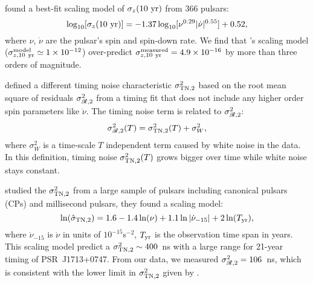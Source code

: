 {\bfref
\citet{hlk10} found a best-fit scaling model of $\sigma_z({\rm 10~yr})$ 
from 366 pulsars:
\begin{equation}
\label{eq:hlk10}
\log_{10}[\sigma_z({\rm 10~yr})] =
-1.37\log_{10}[\nu^{0.29}|\dot{\nu}|^{0.55}]+0.52,
\end{equation} 
where $\nu$, $\dot{\nu}$ are the pulsar's spin and spin-down rate.
We find that \citet{hlk10}'s scaling model ($\sigma^{\rm model}_{z, \rm
10~yr}\simeq1\times10^{-12}$) over-predict $\sigma^{\rm measured}_{z, \rm
10~yr}=4.9\times10^{-16}$ by more than three orders of magnitude. 

\citet{ch80} defined a different timing noise characteristic $\sigma^2_{\rm
TN,2}$ based on the root mean square of residuals $\sigma^2_{\mathscr{R},2}$ from a
timing fit that does not include any higher order spin parameters like
$\ddot{\nu}$. 
The timing noise term is related to $\sigma^2_{\mathscr{R},2}$:
\begin{equation}
\sigma^2_{\mathscr{R},2}(T) = \sigma^2_{\rm TN,2}(T) + \sigma^2_W, 
\end{equation}
where $\sigma^2_W$ is a time-scale $T$ independent term caused by white 
noise in the data.
In this definition, timing noise $\sigma^2_{\rm TN,2}(T)$ grows bigger over
time while white noise stays constant.  

\citet{sc10} studied the $\sigma^2_{\rm TN,2}$ from a large sample of pulsars
including canonical pulsars (CPs) and millisecond pulsars, they found a scaling
model:
\begin{equation}
\label{eq:sc10}
\ln(\hat{\sigma}_{\rm TN,2}) = 1.6 - 1.4\ln(\nu) +
1.1\ln|\dot{\nu}_{-15}|+2\ln(T_{\rm yr}),
\end{equation}
where $\dot{\nu}_{-15}$ is $\dot{\nu}$ in units of $10^{-15}$s$^{-2}$, $T_{\rm yr}$ is the 
observation time span in years.
This scaling model predict a $\sigma^2_{\rm TN,2}\sim400$~ns with a large
range for 21-year timing of PSR~J1713+0747. From our data, we measured
$\sigma^2_{\mathscr{R},2}=106$~ns, which is consistent with the lower limit in
$\sigma^2_{\rm TN,2}$ given by \citet{sc10}. 

}

